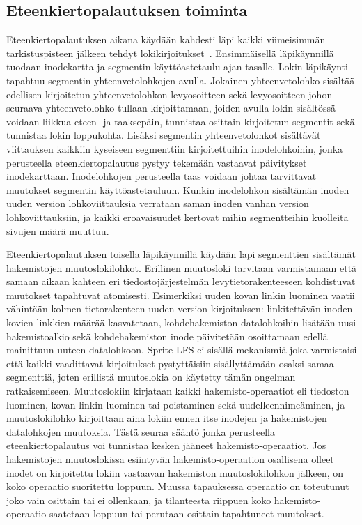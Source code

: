 \subsection{Eteenkiertopalautuksen toiminta}
Eteenkiertopalautuksen aikana käydään kahdesti läpi kaikki viimeisimmän tarkistuspisteen jälkeen tehdyt lokikirjoitukset~\cite{SpriteRosenblumThesis}.
Ensimmäisellä läpikäynnillä tuodaan inodekartta ja segmentin käyttöastetaulu ajan tasalle.
Lokin läpikäynti tapahtuu segmentin yhteenvetolohkojen avulla.
Jokainen yhteenvetolohko sisältää edellisen kirjoitetun yhteenvetolohkon levyosoitteen sekä levyosoitteen johon seuraava yhteenvetolohko tullaan kirjoittamaan,
joiden avulla lokin sisältössä voidaan liikkua eteen- ja taaksepäin, tunnistaa osittain kirjoitetun segmentit sekä tunnistaa lokin loppukohta.
Lisäksi segmentin yhteenvetolohkot sisältävät viittauksen kaikkiin kyseiseen segmenttiin kirjoitettuihin inodelohkoihin,
jonka perusteella eteenkiertopalautus pystyy tekemään vastaavat päivitykset inodekarttaan.
Inodelohkojen perusteella taas voidaan johtaa tarvittavat muutokset segmentin käyttöastetauluun.
Kunkin inodelohkon sisältämän inoden uuden version lohkoviittauksia verrataan saman inoden vanhan version lohkoviittauksiin,
ja kaikki eroavaisuudet kertovat mihin segmentteihin kuolleita sivujen määrä muuttuu.

Eteenkiertopalautuksen toisella läpikäynnillä käydään lapi segmenttien sisältämät hakemistojen muutoslokilohkot.
Erillinen muutosloki tarvitaan varmistamaan että samaan aikaan kahteen eri tiedostojärjestelmän levytietorakenteeseen kohdistuvat muutokset tapahtuvat atomisesti.
Esimerkiksi uuden kovan linkin luominen vaatii vähintään kolmen tietorakenteen uuden version kirjoituksen: linkitettävän inoden kovien linkkien määrää kasvatetaan,
kohdehakemiston datalohkoihin lisätään uusi hakemistoalkio sekä kohdehakemiston inode päivitetään osoittamaan edellä mainittuun uuteen datalohkoon.
Sprite LFS ei sisällä mekanismiä joka varmistaisi että kaikki vaadittavat kirjoitukset pystyttäisiin sisällyttämään osaksi samaa segmenttiä,
joten erillistä muutoslokia on käytetty tämän ongelman ratkaisemiseen.
Muutoslokiin kirjataan kaikki hakemisto-operaatiot eli tiedoston luominen, kovan linkin luominen tai poistaminen sekä uudelleennimeäminen,
ja muutoslokilohko kirjoittaan aina lokiin ennen itse inodejen ja hakemistojen datalohkojen muutoksia.
Tästä seuraa sääntö jonka perusteella eteenkiertopalautus voi tunnistaa kesken jääneet hakemisto-operaatiot.
Jos hakemistojen muutoslokissa esiintyvän hakemisto-operaation osallisena olleet inodet on kirjoitettu lokiin
vastaavan hakemiston muutoslokilohkon jälkeen,
on koko operaatio suoritettu loppuun.
Muussa tapauksessa operaatio on toteutunut joko vain osittain tai ei ollenkaan,
ja tilanteesta riippuen koko hakemisto-operaatio saatetaan loppuun tai perutaan osittain tapahtuneet muutokset.

